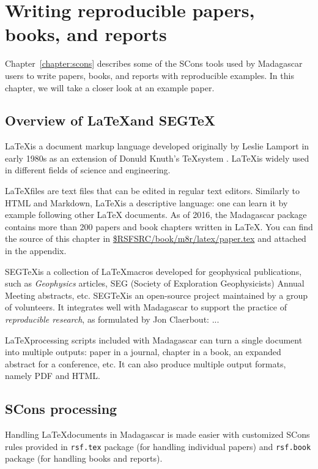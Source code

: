\chapter{Writing reproducible papers, books, and reports}

Chapter~\ref{chapter:scons} describes some of the SCons tools used by
Madagascar users to write papers, books, and reports with reproducible
examples. In this chapter, we will take a closer look at an example paper.

\section{Overview of \LaTeX and SEG\TeX}

\LaTeX is a document markup language developed originally by Leslie
Lamport in early 1980s \cite[]{latex} as an extension of Donuld
Knuth's \TeX system \cite[]{tex}. \LaTeX is widely used in different
fields of science and engineering.

\LaTeX files are text files that can be edited in regular text
editors. Similarly to HTML and Markdown, \LaTeX is a descriptive
language: one can learn it by example following other \LaTeX
documents. As of 2016, the Madagascar package contains more than 200
papers and book chapters written in \LaTeX. You can find the source of
this chapter in
\href{https://github.com/ahay/src/blob/master/book/m8r/latex/paper.tex}
     {\$RSFSRC/book/m8r/latex/paper.tex}
and attached in the appendix.

SEG\TeX is a collection of \LaTeX macros developed for geophysical
publications, such as \emph{Geophysics} articles, SEG (Society of
Exploration Geophysicists) Annual Meeting abstracts, etc. SEG\TeX is
an open-source project maintained by a group of volunteers. It
integrates well with Madagascar to support the practice of
\emph{reproducible research}, as formulated by Jon Claerbout: ...

\LaTeX processing scripts included with Madagascar can turn a single
document into multiple outputs: paper in a journal, chapter in a book,
an expanded abstract for a conference, etc. It can also produce
multiple output formats, namely PDF and HTML.

\section{SCons processing}

Handling \LaTeX documents in Madagascar is made easier with customized
SCons rules provided in \texttt{rsf.tex} package (for handling
individual papers) and \texttt{rsf.book} package (for handling books
and reports).

